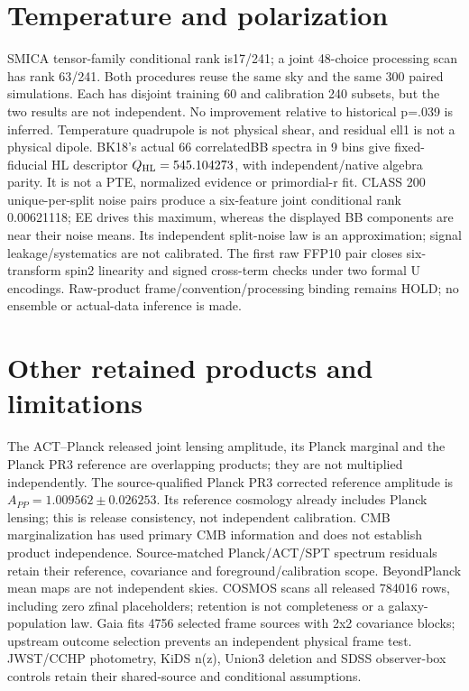 \documentclass[10pt]{article}
\begin{document}
\section{Temperature and polarization}
SMICA tensor-family conditional rank is17/241; a joint 48-choice processing scan
has rank 63/241. Both procedures reuse the same sky and the same 300 paired simulations. Each has
disjoint training 60 and calibration 240 subsets, but the two results are not independent. No
improvement relative to historical p=.039 is inferred. Temperature quadrupole is not
physical shear, and residual ell1 is not a physical dipole.
BK18's actual 66 correlatedBB spectra in 9 bins give fixed-fiducial HL descriptor
$Q_{\rm HL}=545.104273$, with independent/native algebra parity. It is not a PTE,
normalized evidence or primordial-r fit. CLASS 200 unique-per-split noise pairs
produce a six-feature joint conditional rank 0.00621118; EE drives this maximum,
whereas the displayed BB components are near their noise means. Its independent
split-noise law is an approximation; signal leakage/systematics are not calibrated.
The first raw FFP10 pair closes six-transform spin2 linearity and signed cross-term
checks under two formal U encodings. Raw-product frame/convention/processing binding
remains HOLD; no ensemble or actual-data inference is made.
\section{Other retained products and limitations}
The ACT--Planck released joint lensing amplitude, its Planck marginal and the Planck
PR3 reference are overlapping products; they are not multiplied independently.
The source-qualified Planck PR3 corrected reference amplitude is $A_{PP}=1.009562\pm0.026253$. Its reference cosmology already includes Planck lensing; this is release consistency, not independent calibration. CMB marginalization has used primary CMB information and does not establish product independence.
Source-matched Planck/ACT/SPT spectrum residuals retain their reference, covariance
and foreground/calibration scope. BeyondPlanck mean maps are not independent skies.
COSMOS scans all released 784016 rows, including zero zfinal placeholders; retention
is not completeness or a galaxy-population law. Gaia fits 4756 selected frame sources
with 2x2 covariance blocks; upstream outcome selection prevents an independent physical
frame test. JWST/CCHP photometry, KiDS n(z), Union3 deletion and SDSS observer-box
controls retain their shared-source and conditional assumptions.
\end{document}
